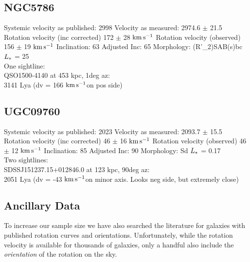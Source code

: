 \documentclass[iop]{emulateapj-rtx4}
\newcommand{\kms}{$\rm km\, s^{-1}$}
\begin{document}

%


\subsection{NGC5786}


Systemic velocity as published: 2998
Velocity as measured: 2974.6 $\pm$ 21.5
Rotation velocity (inc corrected) 172 $\pm$ 28 \kms
Rotation velocity (observed) 156 $\pm$ 19 \kms
Inclination: 63
Adjusted Inc: 65
Morphology: (R'\_2)SAB(s)bc
$L_{\**}$ = 25 \\

One sightline: \\
QSO1500-4140 at 453 kpc, 1deg az: \\
3141 Lya (dv = 166 \kms on pos side)


\subsection{UGC09760}
Systemic velocity as published: 2023
Velocity as measured: 2093.7 $\pm$ 15.5
Rotation velocity (inc corrected) 46 $\pm$ 16 \kms
Rotation velocity (observed) 46 $\pm$ 12 \kms
Inclination: 85
Adjusted Inc: 90
Morphology: Sd
$L_{\**}$ = 0.17 \\

Two sightlines: \\
SDSSJ151237.15+012846.0 at 123 kpc, 90deg az: \\
2051 Lya (dv = -43 \kms on minor axis. Looks neg side, but extremely close)



\subsection{Ancillary Data}
To increase our sample size we have also searched the literature for galaxies with published rotation curves and orientations. Unfortunately, while the rotation velocity is available for thousands of galaxies, only a handful also include the \emph{orientation} of the rotation on the sky. \\
\end{document}
